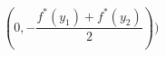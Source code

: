 \documentclass[preview]{standalone}
\begin{document}
\begin{center}
$(0, -\dfrac{f^*(y_1) + f^*(y_2)}{2}))$
\end{center}
\end{document}
